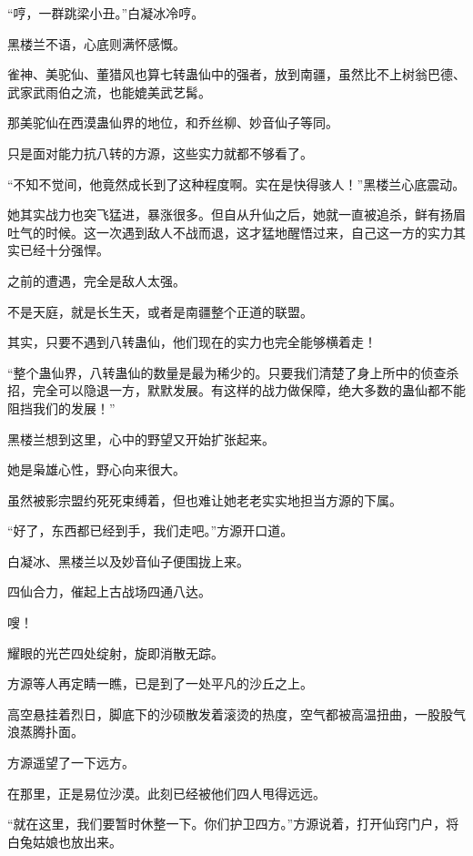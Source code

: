 
\begin{this_body}

“哼，一群跳梁小丑。”白凝冰冷哼。

黑楼兰不语，心底则满怀感慨。

雀神、美驼仙、董猎风也算七转蛊仙中的强者，放到南疆，虽然比不上树翁巴德、武家武雨伯之流，也能媲美武艺髯。

那美驼仙在西漠蛊仙界的地位，和乔丝柳、妙音仙子等同。

只是面对能力抗八转的方源，这些实力就都不够看了。

“不知不觉间，他竟然成长到了这种程度啊。实在是快得骇人！”黑楼兰心底震动。

她其实战力也突飞猛进，暴涨很多。但自从升仙之后，她就一直被追杀，鲜有扬眉吐气的时候。这一次遇到敌人不战而退，这才猛地醒悟过来，自己这一方的实力其实已经十分强悍。

之前的遭遇，完全是敌人太强。

不是天庭，就是长生天，或者是南疆整个正道的联盟。

其实，只要不遇到八转蛊仙，他们现在的实力也完全能够横着走！

“整个蛊仙界，八转蛊仙的数量是最为稀少的。只要我们清楚了身上所中的侦查杀招，完全可以隐退一方，默默发展。有这样的战力做保障，绝大多数的蛊仙都不能阻挡我们的发展！”

黑楼兰想到这里，心中的野望又开始扩张起来。

她是枭雄心性，野心向来很大。

虽然被影宗盟约死死束缚着，但也难让她老老实实地担当方源的下属。

“好了，东西都已经到手，我们走吧。”方源开口道。

白凝冰、黑楼兰以及妙音仙子便围拢上来。

四仙合力，催起上古战场四通八达。

嗖！

耀眼的光芒四处绽射，旋即消散无踪。

方源等人再定睛一瞧，已是到了一处平凡的沙丘之上。

高空悬挂着烈日，脚底下的沙硕散发着滚烫的热度，空气都被高温扭曲，一股股气浪蒸腾扑面。

方源遥望了一下远方。

在那里，正是易位沙漠。此刻已经被他们四人甩得远远。

“就在这里，我们要暂时休整一下。你们护卫四方。”方源说着，打开仙窍门户，将白兔姑娘也放出来。


\end{this_body}
